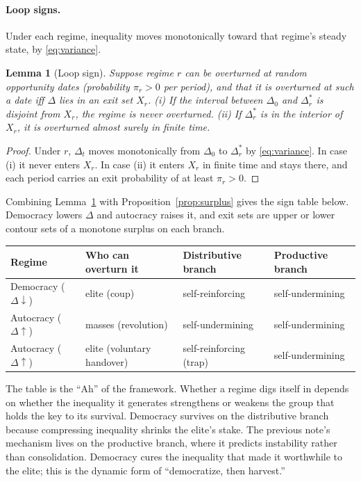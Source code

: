 \documentclass[11pt]{article}
\newtheorem{lemma}{Lemma}
\theoremstyle{remark}
\begin{document}
\paragraph{Loop signs.}  Under each regime, inequality moves monotonically toward that regime's steady state, by \eqref{eq:variance}.

\begin{lemma}[Loop sign]\label{lem:loopsign}
Suppose regime $r$ can be overturned at random opportunity dates (probability $\pi_r>0$ per period), and that it is overturned at such a date iff $\Delta$ lies in an exit set $X_r$.  (i) If the interval between $\Delta_0$ and $\Delta^*_r$ is disjoint from $X_r$, the regime is never overturned.  (ii) If $\Delta^*_r$ is in the interior of $X_r$, it is overturned almost surely in finite time.
\end{lemma}
\begin{proof}
Under $r$, $\Delta_t$ moves monotonically from $\Delta_0$ to $\Delta^*_r$ by \eqref{eq:variance}.  In case (i) it never enters $X_r$.  In case (ii) it enters $X_r$ in finite time and stays there, and each period carries an exit probability of at least $\pi_r>0$.
\end{proof}

Combining Lemma~\ref{lem:loopsign} with Proposition~\ref{prop:surplus} gives the sign table below.  Democracy lowers $\Delta$ and autocracy raises it, and exit sets are upper or lower contour sets of a monotone surplus on each branch.

\begin{center}
\small
\begin{tabular}{llll}
\toprule
Regime & Who can overturn it & Distributive branch & Productive branch\\
\midrule
Democracy ($\Delta\downarrow$) & elite (coup) & self-reinforcing & self-undermining\\
Autocracy ($\Delta\uparrow$) & masses (revolution) & self-undermining & self-undermining\\
Autocracy ($\Delta\uparrow$) & elite (voluntary handover) & self-reinforcing (trap) & self-undermining\\
\bottomrule
\end{tabular}
\end{center}

The table is the ``Ah'' of the framework.  Whether a regime digs itself in depends on whether the inequality it generates strengthens or weakens the group that holds the key to its survival.  Democracy survives on the distributive branch because compressing inequality shrinks the elite's stake.  The previous note's mechanism lives on the productive branch, where it predicts instability rather than consolidation.  Democracy cures the inequality that made it worthwhile to the elite; this is the dynamic form of ``democratize, then harvest.''
\end{document}
